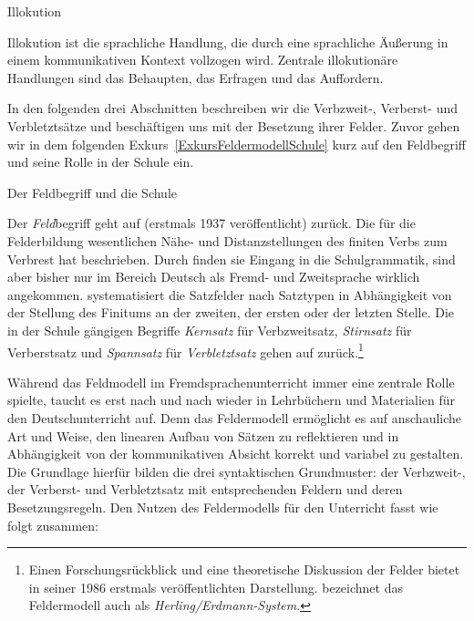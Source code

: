 \begin{Definition}{Illokution}
    
\noindent 
Illokution ist die sprachliche Handlung, die durch eine sprachliche Äußerung in einem kommunikativen Kontext vollzogen wird. Zentrale illokutionäre Handlungen sind das Behaupten, das Erfragen und das Auffordern. 
\label{Def_Illokution}
\end{Definition}



In den folgenden drei Abschnitten beschreiben wir die Verbzweit-, Verberst- und Verbletztsätze und beschäftigen uns mit der Besetzung ihrer Felder. Zuvor gehen wir in dem folgenden Exkurs~\ref{ExkursFeldermodellSchule} kurz auf den Feldbegriff und seine Rolle in der Schule ein. 

\begin{Exkurs}{Der Feldbegriff und die Schule}
\label{ExkursFeldermodellSchule}

Der \textit{Feld}begriff geht auf \citet[27]{Drach1963} (erstmals 1937 veröffentlicht) zurück. Die für die Felderbildung wesentlichen Nähe- und Distanzstellungen des finiten Verbs zum Verbrest hat \citet[298--306]{Herling1821} beschrieben. Durch \citet[310--313]{Becker1837} finden sie Eingang in die Schulgrammatik, sind aber bisher nur im Bereich Deutsch als Fremd- und Zweitsprache wirklich angekommen. \citet[181--197]{Erdmann1886} systematisiert die Satzfelder nach Satztypen in Abhängigkeit von der Stellung des Finitums an der zweiten, der ersten oder der letzten Stelle. Die in der Schule gängigen Begriffe \textit{Kernsatz} für Verbzweitsatz, \textit{Stirnsatz} für Verberstsatz und \textit{Spannsatz} für \textit{Verbletztsatz} gehen auf \citet[96]{Glinz1952} zurück.\footnote{Einen Forschungsrückblick und eine theoretische Diskussion der Felder bietet \citet{Hoehle19862018} in seiner 1986 erstmals veröffentlichten Darstellung. \citet[288]{Hoehle19862018} bezeichnet das Feldermodell auch als \textit{Herling/Erdmann-System}.} 

Während das Feldmodell im Fremdsprachenunterricht immer eine zentrale Rolle spielte, taucht es erst nach und nach wieder in Lehrbüchern und Materialien für den Deutschunterricht auf. Denn das Feldermodell ermöglicht es auf anschauliche Art und Weise, den linearen Aufbau von Sätzen zu reflektieren und in Abhängigkeit von der kommunikativen Absicht korrekt und variabel zu gestalten. Die Grundlage hierfür bilden die drei syntaktischen Grundmuster: der Verbzweit-, der Verberst- und Verbletztsatz mit entsprechenden Feldern und deren Besetzungsregeln. Den Nutzen des Feldermodells für den Unterricht fasst \citet[104]{Duerscheid2012} wie folgt zusammen: 


\end{Exkurs}
